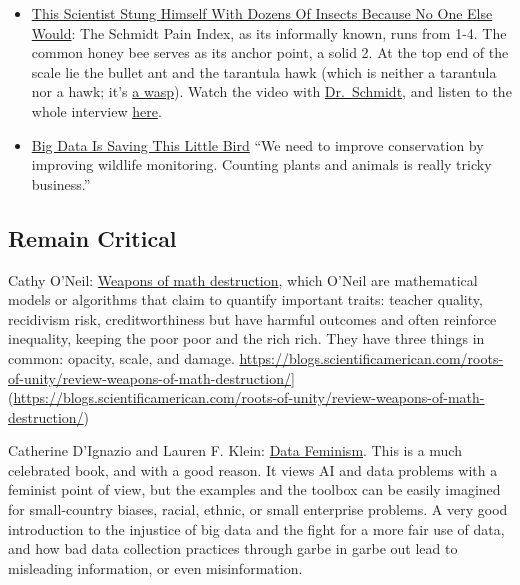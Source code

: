 \documentclass[
  a4paper,
  openany, a4paper, oneside]{book}
\providecommand{\tightlist}{%
  \setlength{\itemsep}{0pt}\setlength{\parskip}{0pt}}
\begin{document}
\begin{itemize}
\tightlist
\item
  \href{https://fivethirtyeight.com/features/this-scientist-stung-himself-with-dozens-of-insects-because-no-one-else-would/}{This Scientist Stung Himself With Dozens Of Insects Because No One Else Would}: The Schmidt Pain Index, as its informally known, runs from 1-4. The common honey bee serves as its anchor point, a solid 2. At the top end of the scale lie the bullet ant and the tarantula hawk (which is neither a tarantula nor a hawk; it's \href{https://www.wired.com/2015/07/absurd-creature-of-the-week-tarantula-hawk/}{a wasp}). Watch the video with \href{https://youtu.be/i0LjT-qkUes}{Dr.~Schmidt}, and listen to the whole interview \href{https://podcasts.apple.com/us/podcast/48-the-schmidt-sting-pain-index/id1011406983?i=1000391467968}{here}.
\item
  \href{https://fivethirtyeight.com/features/big-data-is-saving-this-little-bird/}{Big Data Is Saving This Little Bird} ``We need to improve conservation by improving wildlife monitoring. Counting plants and animals is really tricky business.''
\end{itemize}

\hypertarget{remain-critical}{%
\subsection{Remain Critical}\label{remain-critical}}

Cathy O'Neil: \href{https://en.wikipedia.org/wiki/Weapons_of_Math_Destruction}{Weapons of math destruction}, which O'Neil are mathematical models or algorithms that claim to quantify important traits: teacher quality, recidivism risk, creditworthiness but have harmful outcomes and often reinforce inequality, keeping the poor poor and the rich rich. They have three things in common: opacity, scale, and damage. \url{https://blogs.scientificamerican.com/roots-of-unity/review-weapons-of-math-destruction/}{]}(\url{https://blogs.scientificamerican.com/roots-of-unity/review-weapons-of-math-destruction/})

Catherine D'Ignazio and Lauren F. Klein: \href{https://mitpress.mit.edu/books/data-feminism}{Data Feminism}. This is a much celebrated book, and with a good reason. It views AI and data problems with a feminist point of view, but the examples and the toolbox can be easily imagined for small-country biases, racial, ethnic, or small enterprise problems. A very good introduction to the injustice of big data and the fight for a more fair use of data, and how bad data collection practices through garbe in garbe out lead to misleading information, or even misinformation.
\end{document}
